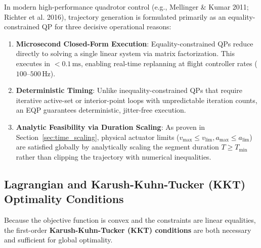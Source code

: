 \documentclass[11pt,a4paper]{article}
\begin{document}
\begin{dronebox}
In modern high-performance quadrotor control (e.g., Mellinger \& Kumar 2011; Richter et al. 2016), trajectory generation is formulated primarily as an equality-constrained QP for three decisive operational reasons:
\begin{enumerate}
    \item \textbf{Microsecond Closed-Form Execution}: Equality-constrained QPs reduce directly to solving a single linear system via matrix factorization. This executes in $<0.1\,\text{ms}$, enabling real-time replanning at flight controller rates ($100$--$500\,\text{Hz}$).
    \item \textbf{Deterministic Timing}: Unlike inequality-constrained QPs that require iterative active-set or interior-point loops with unpredictable iteration counts, an EQP guarantees deterministic, jitter-free execution.
    \item \textbf{Analytic Feasibility via Duration Scaling}: As proven in Section~\ref{sec:time_scaling}, physical actuator limits ($v_{\max} \le v_{\lim}, a_{\max} \le a_{\lim}$) are satisfied globally by analytically scaling the segment duration $T \ge T_{\min}$ rather than clipping the trajectory with numerical inequalities.
\end{enumerate}
\end{dronebox}

\subsection{Lagrangian and Karush-Kuhn-Tucker (KKT) Optimality Conditions}

Because the objective function is convex and the constraints are linear equalities, the first-order \textbf{Karush-Kuhn-Tucker (KKT) conditions} are both necessary and sufficient for global optimality.
\end{document}
